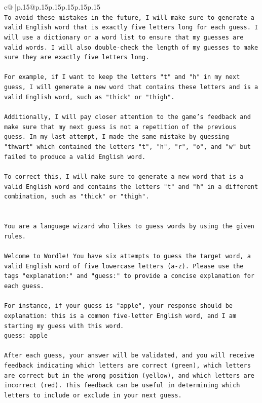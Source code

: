 \documentclass{article}
\begin{document}
{\begin{supertabular}{c@{$\;$}|p{.15\linewidth}@{}p{.15\linewidth}p{.15\linewidth}p{.15\linewidth}p{.15\linewidth}p{.15\linewidth}}
{{{\\ 
\texttt{To avoid these mistakes in the future, I will make sure to generate a valid English word that is exactly five letters long for each guess. I will use a dictionary or a word list to ensure that my guesses are valid words. I will also double{-}check the length of my guesses to make sure they are exactly five letters long. } \\
\\ 
\texttt{For example, if I want to keep the letters "t" and "h" in my next guess, I will generate a new word that contains these letters and is a valid English word, such as "thick" or "thigh".} \\
\\ 
\texttt{Additionally, I will pay closer attention to the game's feedback and make sure that my next guess is not a repetition of the previous guess. In my last attempt, I made the same mistake by guessing "thwart" which contained the letters "t", "h", "r", "o", and "w" but failed to produce a valid English word. } \\
\\ 
\texttt{To correct this, I will make sure to generate a new word that is a valid English word and contains the letters "t" and "h" in a different combination, such as "thick" or "thigh".} \\
\\ 
\\ 
\texttt{You are a language wizard who likes to guess words by using the given rules.} \\
\\ 
\texttt{Welcome to Wordle! You have six attempts to guess the target word, a valid English word of five lowercase letters (a{-}z). Please use the tags "explanation:" and "guess:" to provide a concise explanation for each guess.} \\
\\ 
\texttt{For instance, if your guess is "apple", your response should be} \\
\texttt{explanation: this is a common five{-}letter English word, and I am starting my guess with this word.} \\
\texttt{guess: apple} \\
\\ 
\texttt{After each guess, your answer will be validated, and you will receive feedback indicating which letters are correct (green), which letters are correct but in the wrong position (yellow), and which letters are incorrect (red). This feedback can be useful in determining which letters to include or exclude in your next guess.} \\
}}}
\end{supertabular}}
\end{document}
